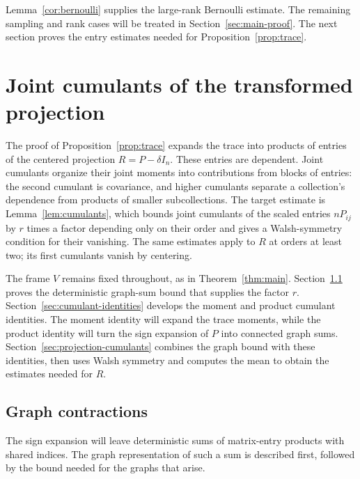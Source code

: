 \documentclass[11pt]{article}
\theoremstyle{definition}
\theoremstyle{remark}
\theoremstyle{plain}
\begin{document}
Lemma~\ref{cor:bernoulli} supplies the large-rank Bernoulli estimate.
The remaining sampling and rank cases will be treated in
Section~\ref{sec:main-proof}. The next section proves the entry estimates
needed for Proposition~\ref{prop:trace}.

\section{Joint cumulants of the transformed projection}
\label{sec:cumulants}

The proof of Proposition~\ref{prop:trace} expands the trace into
products of entries of the centered projection $R=P-\delta I_n$.
These entries are dependent. Joint cumulants organize their joint
moments into contributions from blocks of entries: the second
cumulant is covariance, and higher cumulants separate a collection's
dependence from products of smaller subcollections. The target estimate is
Lemma~\ref{lem:cumulants}, which bounds joint cumulants of the scaled
entries $nP_{ij}$ by $r$ times a factor depending only on their order
and gives a Walsh-symmetry condition for their vanishing. The same
estimates apply to $R$ at orders at least two; its first cumulants
vanish by centering.

The frame $V$ remains fixed throughout, as in Theorem~\ref{thm:main}.
Section~\ref{sec:graph-contractions} proves the deterministic
graph-sum bound that supplies the factor $r$.
Section~\ref{sec:cumulant-identities} develops the moment and product
cumulant identities. The moment identity will expand the trace
moments, while the product identity will turn the sign expansion of
$P$ into connected graph sums. Section~\ref{sec:projection-cumulants}
combines the graph bound with these identities, then uses Walsh
symmetry and computes the mean to obtain the estimates needed for $R$.

\subsection{Graph contractions}\label{sec:graph-contractions}

The sign expansion will leave deterministic sums of matrix-entry
products with shared indices. The graph representation of such a sum
is described first, followed by the bound needed for the graphs that arise.
\end{document}
